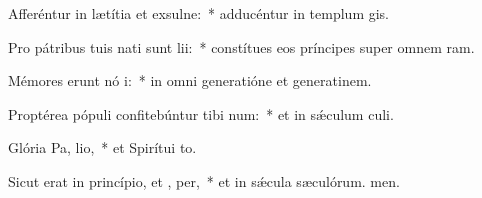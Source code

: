 \item Afferéntur in lætítia et exsulne:~* adducéntur in templum gis.
\item Pro pátribus tuis nati sunt  lii:~* constítues eos príncipes super omnem ram.
\item Mémores erunt nó i:~* in omni generatióne et generatinem.
\item Proptérea pópuli confitebúntur tibi  num:~* et in sǽculum culi.
\item Glória Pa,  lio,~* et Spirítui to.
\item Sicut erat in princípio, et ,  per,~* et in sǽcula sæculórum. men.

